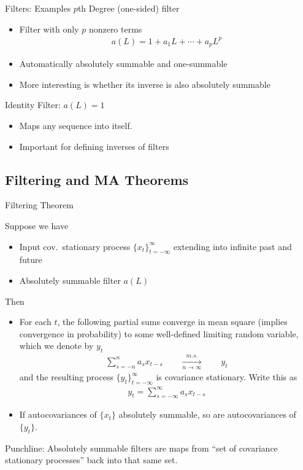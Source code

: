 \documentclass[aspectratio=169, handout]{beamer}
\newcommand{\ra}{\rightarrow}
\newcommand{\msto}{\xrightarrow{m.s.}}
\begin{document}
{\footnotesize
\begin{frame}{Filters: Examples}
$p$th Degree (one-sided) filter
\begin{itemize}
  \item Filter with only $p$ nonzero terms
    \begin{align*}
      a(L) = 1 + a_1 L + \cdots + a_p L^p
    \end{align*}

  \item Automatically absolutely summable and one-summable
  \item More interesting is whether its inverse is also absolutely
    summable
\end{itemize}
\pause
Identity Filter: $a(L) = 1$
\begin{itemize}
  \item Maps any sequence into itself.
  \pause
  \item Important for defining inverses of filters
\end{itemize}
\end{frame}
}


\subsection{Filtering and MA Theorems}

{\scriptsize
\begin{frame}{Filtering Theorem}

Suppose we have
\begin{itemize}
  \item Input \alert{cov.\ stationary} process
    $\{x_t\}_{t=-\infty}^\infty$ extending into infinite past and future

  \item Absolutely summable filter $a(L)$
\end{itemize}
\pause
Then
\begin{itemize}
  \item For each $t$, the following partial sums converge in mean square
    (implies convergence in probability) to some well-defined limiting
    random variable, which we denote by $y_t$
    \begin{align*}
      \sum_{s=-n}^n a_s x_{t-s}
      \qquad
      \underset{n\ra\infty}{\msto}
      \qquad
      y_t
    \end{align*}
    \pause
    and the resulting process $\{y_t\}_{t=-\infty}^\infty$ is covariance
    stationary.
    \pause
    Write this as
    \pause
    \begin{align*}
      y_t = \sum_{s=-\infty}^\infty a_s x_{t-s}
    \end{align*}

  \item If autocovariances of $\{x_t\}$ absolutely summable, so are
    autocovariances of $\{y_t\}$.
\end{itemize}
\pause
\alert{Punchline}: Absolutely summable filters are maps from ``set of
covariance stationary processes'' back into that same set.
\end{frame}
}
\end{document}
